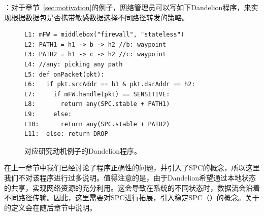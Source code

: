 ：对于章节~\ref{sec:motivation}的例子，网络管理员可以写如下Dandelion程序，来实现根据数据包是否携带敏感数据选择不同路径转发的策略。




\begin{figure}[h]
{\small
\begin{verbatim}
L1: mFW = middlebox("firewall", "stateless")
L2: PATH1 = h1 -> b -> h2 //b: waypoint
L3: PATH2 = h1 -> c -> h2 //c: waypoint
L4: //any: picking any path
L5: def onPacket(pkt):
L6:   if pkt.srcAddr == h1 & pkt.dsrAddr == h2:
L7:     if mFW.handle(pkt) == SENSITIVE:
L8:       return any(SPC.stable + PATH1)
L9:     else:
L10:      return any(SPC.stable + PATH2)
L11:  else: return DROP
\end{verbatim}
}
    \caption{对应研究动机例子的Dandelion程序。}
\label{fig:code}
\end{figure}

在上一章节中我们已经讨论了程序正确性的问题，并引入了SPC的概念，所以这里我们不对该程序进行过多说明。值得注意的是，由于Dandelion希望通过本地状态的共享，实现网络资源的充分利用。这会导致在系统的不同状态时，数据流会沿着不同路径传输。因此，这里需要对SPC进行拓展，引入稳定SPC（）的概念。关于的定义会在随后章节中说明。

%



